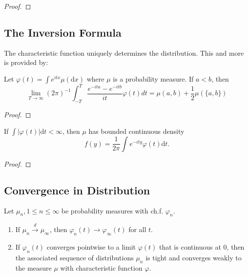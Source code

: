 \begin{proof}

\end{proof}

\subsection{The Inversion Formula}

The characteristic function uniquely determines the distribution. This and more is provided by:
\begin{theorem}
    Let $\varphi(t)=\int e^{itx}\mu(\mathrm{d}x)$ where $\mu$ is a probability measure. If $a<b$, then
    \begin{equation}
        \lim _{T \rightarrow \infty}(2 \pi)^{-1} \int_{-T}^{T} \frac{e^{-i t a}-e^{-i t b}}{i t} \varphi(t) d t=\mu(a, b)+\frac{1}{2} \mu(\{a, b\})
    \end{equation}
\end{theorem}

\begin{proof}

\end{proof}

\begin{theorem}
    If $\int|\varphi(t)|\mathrm{d}t<\infty$, then $\mu$ has bounded continuous density
    \begin{equation}
        f(y)=\frac{1}{2\pi}\int e^{-ity}\varphi(t) \mathrm{d}t.
    \end{equation}
\end{theorem}

\begin{proof}

\end{proof}

\subsection{Convergence in Distribution}

\begin{theorem}
    Let $\mu_{n},1\leq n\leq\infty$ be probability measures with ch.f. $\varphi_{n}$.
    \begin{enumerate}
        \item If $\mu_{n}\stackrel{d}{\rightarrow}\mu_{\infty}$, then $\varphi_{n}(t)\rightarrow\varphi_{\infty}(t)$ for all $t$.
        \item If $\varphi_{n}(t)$ converges pointwise to a limit $\varphi(t)$ that is continuous at $0$, then the associated sequence of distributions $\mu_{n}$ is tight and converges weakly to the measure $\mu$ with characteristic function $\varphi$.
    \end{enumerate}
\end{theorem}

